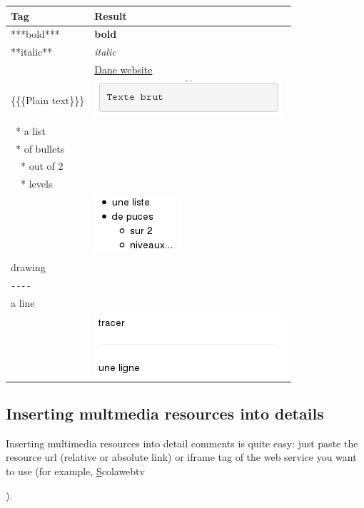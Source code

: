 {%
\begin{center}
 \begin{tabular}{|l|l|}
 \hline
  Tag & Result\\
  \hline
  \hline
  ***bold*** & \textbf{bold}\\
  \hline
  **italic** & \textit{italic}\\
  \hline
  [http://dane.ac-versailles.fr Le site de la Dane] & \href{http://dane.ac-versailles/fr}{Dane website}\\
  \hline
  \{\{\{Plain text\}\}\} & \includegraphics[scale=0.7]{./images/texte_brut}\\
  \hline
  ~* a list\\
  ~* of bullets\\
  ~~* out of 2\\
  ~~* levels\\ & \includegraphics[scale=0.7]{./images/liste_puce}\\
  \hline
  drawing\\
  \verb|----|\\
  a line\\ & \includegraphics[scale=0.7]{./images/ligne_commentaire}\\
  \hline
  \end{tabular}
\end{center}

\subsection{Inserting multmedia resources into details}\label{enrichissement_multimedia}

Inserting multimedia resources into detail comments is quite easy: just paste 
the resource url (relative or absolute link) or iframe tag of the web service 
you want to use (for example, \href{https://scolawebtv.crdp-versailles.fr/}
Scolawebtv}).

